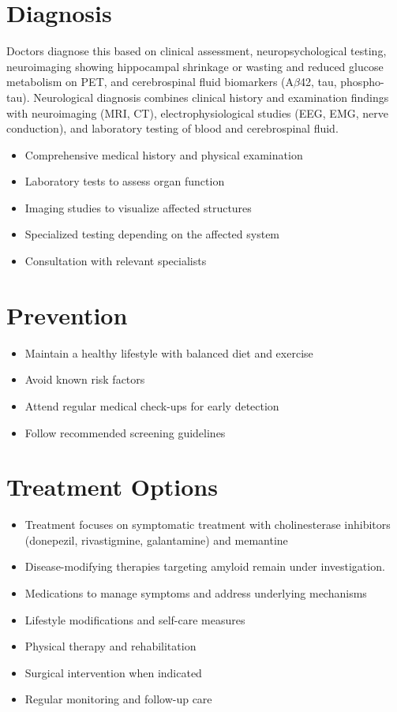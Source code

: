 \section{Diagnosis}
Doctors diagnose this based on clinical assessment, neuropsychological testing, neuroimaging showing hippocampal shrinkage or wasting and reduced glucose metabolism on PET, and cerebrospinal fluid biomarkers (A$\beta$42, tau, phospho-tau). Neurological diagnosis combines clinical history and examination findings with neuroimaging (MRI, CT), electrophysiological studies (EEG, EMG, nerve conduction), and laboratory testing of blood and cerebrospinal fluid.

\begin{itemize}[noitemsep]
  \item Comprehensive medical history and physical examination
  \item Laboratory tests to assess organ function
  \item Imaging studies to visualize affected structures
  \item Specialized testing depending on the affected system
  \item Consultation with relevant specialists
\end{itemize}
\section{Prevention}
\begin{itemize}[noitemsep]
  \item Maintain a healthy lifestyle with balanced diet and exercise
  \item Avoid known risk factors
  \item Attend regular medical check-ups for early detection
  \item Follow recommended screening guidelines
\end{itemize}
\section{Treatment Options}
\begin{itemize}[noitemsep]
  \item Treatment focuses on symptomatic treatment with cholinesterase inhibitors (donepezil, rivastigmine, galantamine) and memantine
  \item Disease-modifying therapies targeting amyloid remain under investigation.
  \item Medications to manage symptoms and address underlying mechanisms
  \item Lifestyle modifications and self-care measures
  \item Physical therapy and rehabilitation
  \item Surgical intervention when indicated
  \item Regular monitoring and follow-up care
\end{itemize}
